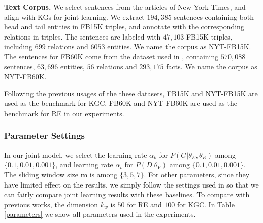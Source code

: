 \documentclass[11pt,a4paper]{article}
\begin{document}
\textbf{Text Corpus.} We select sentences from the articles of New York Times, and align with KGs for joint learning. We extract $194,385$ sentences containing both head and tail entities in FB15K triples, and annotate with the corresponding relations in triples. The sentences are labeled with $47,103$ FB15K triples, including $699$ relations and $6053$ entities. We name the corpus as NYT-FB15K. The sentences for FB60K come from the dataset used in \cite{riedel2010modeling}, containing $570,088$ sentences, $63,696$ entities, $56$ relations and $293,175$ facts. We name the corpus as NYT-FB60K.
 
Following the previous usages of the these datasets, FB15K and NYT-FB15K are used as the benchmark for KGC, FB60K and NYT-FB60K are used as the benchmark for RE in our experiments.







\subsubsection{Parameter Settings}

In our joint model, we select the learning rate $\alpha_k$ for $P(G|{\theta_E,\theta_R})$ among $\{0.1, 0.01, 0.001\}$, and learning rate $\alpha_t$ for $P(D|{\theta_V})$ among $\{0.1, 0.01, 0.001\}$. The sliding window size $\mathbf{m}$ is among $\{3,5,7\}$. For other parameters, since they have limited effect on the results, we simply follow the settings used in \cite{zeng2014relation,lin2016neural} so that we can fairly compare joint learning results with these baselines. To compare with previous works, the dimension $k_w$ is $50$ for RE and $100$ for KGC. In Table \ref{parameters} we show all parameters used in the experiments.
\end{document}
